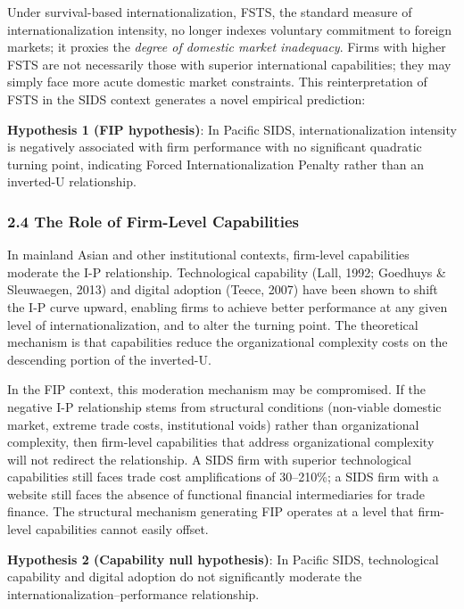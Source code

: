 \documentclass[12pt,a4paper]{article}
\begin{document}
Under survival-based internationalization, FSTS, the standard measure of
internationalization intensity, no longer indexes voluntary commitment
to foreign markets; it proxies the \emph{degree of domestic market
inadequacy}. Firms with higher FSTS are not necessarily those with
superior international capabilities; they may simply face more acute
domestic market constraints. This reinterpretation of FSTS in the SIDS
context generates a novel empirical prediction:

\textbf{Hypothesis 1 (FIP hypothesis)}: In Pacific SIDS,
internationalization intensity is negatively associated with firm
performance with no significant quadratic turning point, indicating
Forced Internationalization Penalty rather than an inverted-U
relationship.

\hypertarget{24-the-role-of-firm-level-capabilities}{%
\subsubsection{2.4 The Role of Firm-Level
Capabilities}\label{24-the-role-of-firm-level-capabilities}}

In mainland Asian and other institutional contexts, firm-level
capabilities moderate the I-P relationship. Technological capability
(Lall, 1992; Goedhuys \& Sleuwaegen, 2013) and digital adoption (Teece,
2007) have been shown to shift the I-P curve upward, enabling firms to
achieve better performance at any given level of internationalization,
and to alter the turning point. The theoretical mechanism is that
capabilities reduce the organizational complexity costs on the
descending portion of the inverted-U.

In the FIP context, this moderation mechanism may be compromised. If the
negative I-P relationship stems from structural conditions (non-viable
domestic market, extreme trade costs, institutional voids) rather than
organizational complexity, then firm-level capabilities that address
organizational complexity will not redirect the relationship. A SIDS
firm with superior technological capabilities still faces trade cost
amplifications of 30--210\%; a SIDS firm with a website still faces the
absence of functional financial intermediaries for trade finance. The
structural mechanism generating FIP operates at a level that firm-level
capabilities cannot easily offset.

\textbf{Hypothesis 2 (Capability null hypothesis)}: In Pacific SIDS,
technological capability and digital adoption do not significantly
moderate the internationalization--performance relationship.
\end{document}
